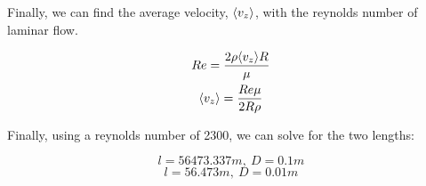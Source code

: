 \documentclass{article}
\begin{document}
\newpage 
Finally, we can find the average velocity, $\langle v_z \rangle$, with the reynolds number of laminar flow. 

\begin{equation}
\begin{gathered}
    Re = \frac{2\rho \langle v_z \rangle R}{\mu}\\
    \langle v_z \rangle = \frac{Re \mu}{2R\rho}
\end{gathered}
\end{equation}

Finally, using a reynolds number of 2300, we can solve for the two lengths:

\begin{equation}
    \boxed{l = 56473.337 m,\: D = 0.1 m}
\end{equation}
\begin{equation}
    \boxed{l = 56.473 m,\: D = 0.01 m}
\end{equation}
\end{document}
